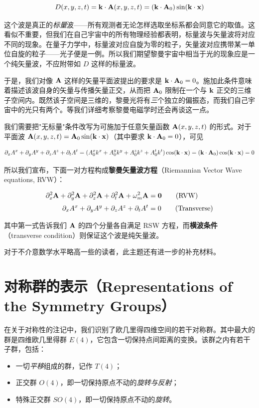 \[
D(x,y,z,t)=\mathbf{k}\cdot\mathbf{A}(x,y,z,t)=(\mathbf{k}\cdot\mathbf{A}_{0})\sin(\mathbf{k}\cdot\mathbf{x})
\]

这个波是真正的\emph{标量}波——所有观测者无论怎样选取坐标系都会同意它的取值。这看似不重要，但我们在自己宇宙中的所有物理经验都表明，标量波与矢量波将对应不同的现象。在量子力学中，标量波对应自旋为零的粒子，矢量波对应携带某一单位自旋的粒子——光子便是一例。所以我们期望黎曼宇宙中相当于光的现象应是一个纯矢量波，不应附带如 $D$ 这样的标量波。

于是，我们对像 $\mathbf{A}$ 这样的矢量平面波提出的要求是 $\mathbf{k}\cdot\mathbf{A}_{0}=0$。施加此条件意味着描述该波自身的矢量与传播矢量正交，从而把 $\mathbf{A}_{0}$ 限制在一个与 $\mathbf{k}$ 正交的三维子空间内。既然该子空间是三维的，黎曼光将有\emph{三}个独立的偏振态，而我们自己宇宙中的光只有两个。等我们详细考察黎曼电磁学时还会再谈这一点。

我们需要把"无标量"条件改写为可施加于任意矢量函数 $\mathbf{A}(x,y,z,t)$ 的形式。对于平面波 $\mathbf{A}(x,y,z,t)=\mathbf{A}_{0}\sin(\mathbf{k}\cdot\mathbf{x})$（其中要求 $\mathbf{k}\cdot\mathbf{A}_{0}=0$），可见

\[
\partial_{x}A^{x}+\partial_{y}A^{y}+\partial_{z}A^{z}+\partial_{t}A^{t}
=(A_{0}^{x}k^{x}+A_{0}^{y}k^{y}+A_{0}^{z}k^{z}+A_{0}^{t}k^{t})\cos(\mathbf{k}\cdot\mathbf{x})
=(\mathbf{k}\cdot\mathbf{A}_{0})\cos(\mathbf{k}\cdot\mathbf{x})=0
\]

所以我们宣布，下面一对方程构成\textbf{黎曼矢量波方程}（Riemannian Vector Wave equations, RVW）：

\begin{align}
\partial_{x}^{2}\mathbf{A}+\partial_{y}^{2}\mathbf{A}+\partial_{z}^{2}\mathbf{A}+\partial_{t}^{2}\mathbf{A}+\omega_m^{2}\mathbf{A} &= \mathbf{0} \tag{RVW}\\[2pt]
\partial_{x}A^{x}+\partial_{y}A^{y}+\partial_{z}A^{z}+\partial_{t}A^{t} &= 0 \tag{Transverse}
\end{align}

其中第一式告诉我们 $\mathbf{A}$ 的四个分量各自满足 RSW 方程，而\textbf{横波条件}（transverse condition）则保证这个波是纯矢量波。

对于不介意数学水平略高一些的读者，此主题还有进一步的补充材料。

\section{对称群的表示（Representations of the Symmetry Groups）}

在关于对称性的注记中，我们识别了欧几里得四维空间的若干对称群。其中最大的群是四维欧几里得群 $E(4)$，它包含一切保持点间距离的变换。该群之内有若干子群，包括：

\begin{itemize}
  \item 一切\emph{平移}组成的群，记作 $T(4)$；
  \item 正交群 $O(4)$，即一切保持原点不动的\emph{旋转与反射}；
  \item 特殊正交群 $SO(4)$，即一切保持原点不动的\emph{旋转}。
\end{itemize}

